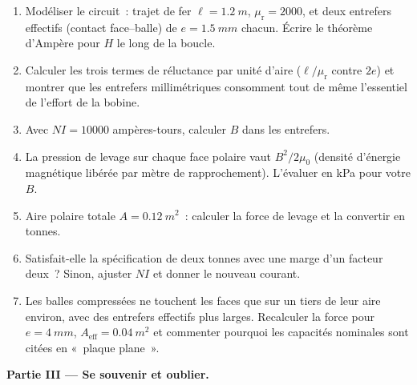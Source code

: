\begin{problem}
\begin{enumerate}[resume]
  \item Modéliser le circuit~: trajet de fer $\ell = \qty{1.2}{m}$,
        $\mu_{\text{r}} = 2000$, et deux entrefers effectifs
        (contact face--balle) de $e = \qty{1.5}{mm}$ chacun.
        Écrire le théorème d'Ampère pour $H$ le long de la boucle.
  \item Calculer les trois termes de réluctance par unité d'aire
        ($\ell/\mu_{\text{r}}$ contre $2e$) et montrer que les
        entrefers millimétriques consomment tout de même
        l'essentiel de l'effort de la bobine.
  \item Avec $NI = \num{10000}$ ampères-tours, calculer $B$ dans
        les entrefers.
  \item La pression de levage sur chaque face polaire vaut
        $B^2/2\mu_0$ (densité d'énergie magnétique libérée par
        mètre de rapprochement). L'évaluer en \unit{kPa} pour
        votre $B$.
  \item Aire polaire totale $A = \qty{0.12}{m^2}$~: calculer la
        force de levage et la convertir en tonnes.
  \item Satisfait-elle la spécification de deux tonnes avec une
        marge d'un facteur deux~? Sinon, ajuster $NI$ et donner le
        nouveau courant.
  \item Les balles compressées ne touchent les faces que sur un
        tiers de leur aire environ, avec des entrefers effectifs
        plus larges. Recalculer la force pour
        $e = \qty{4}{mm}$, $A_{\text{eff}} = \qty{0.04}{m^2}$ et
        commenter pourquoi les capacités nominales sont citées en
        «~plaque plane~».
\end{enumerate}

\medskip\noindent\textbf{Partie III --- Se souvenir et oublier.}


\end{problem}
